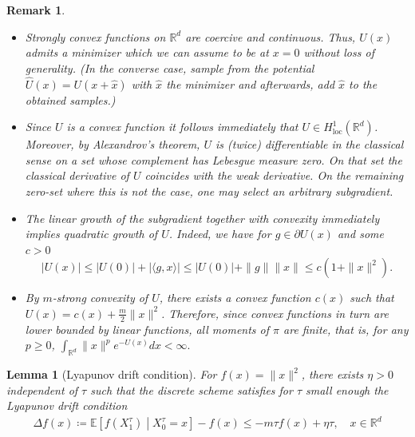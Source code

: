 \documentclass[10pt,a4paper]{amsart}
\newtheorem{remark}{Remark}
\newtheorem{lemma}{Lemma}
\newcommand{\R}{\mathbb{R}}
\begin{document}
\begin{remark}\
\label{rem:Ass_A}
\begin{itemize}
    \item Strongly convex functions on $\R^d$ are coercive and continuous. Thus, $U(x)$ admits a minimizer which we can assume to be at $x=0$ without loss of generality. (In the converse case, sample from the potential $\hat{U}(x) = U(x+\hat{x})$ with $\hat{x}$ the minimizer and afterwards, add $\hat{x}$ to the obtained samples.) 
    \item Since $U$ is a convex function it follows immediately that $U \in H^1_{\text{loc}}( \R^d)$. Moreover, by Alexandrov's theorem, $U$ is (twice) differentiable in the classical sense on a set whose complement has Lebesgue measure zero. On that set the classical derivative of $U$ coincides with the weak derivative. On the remaining zero-set where this is not the case, one may select an arbitrary subgradient.
    \item The linear growth of the subgradient together with convexity immediately implies quadratic growth of $U$. Indeed, we have for $g\in\partial U(x)$ and some $c>0$
    \begin{equation}
        | U(x) | \leq |U(0)| + |\langle g,x\rangle |\leq |U(0)| + \|g\|\|x\|\leq c(1+\|x\|^2).
    \end{equation}
    \item By $m$-strong convexity of $U$, there exists a convex function $c(x)$ such that $U(x) = c(x) + \frac{m}{2}\|x\|^2$. Therefore, since convex functions in turn are lower bounded by linear functions, all moments of $\pi$ are finite, that is, for any $p\geq 0$, $\int_{\R^d} \|x\|^p e^{-U(x)} dx  < \infty.$
\end{itemize}
\end{remark}

\begin{lemma}[Lyapunov drift condition]\label{lemma:lyapunov}
    For $f(x)=\|x\|^2$, there exists $\eta>0$ independent of $\tau$ such that the discrete scheme satisfies for $\tau$ small enough the Lyapunov drift condition 
    \begin{equation*}         
        \begin{aligned}
            \Delta f(x) \coloneqq \mathbb{E} \left[ f(X_1^\tau) \middle| X_0^\tau = x \right] - f(x)
            \leq -m\tau f(x) + \eta\tau,\quad x\in\R^d
        \end{aligned}   
    \end{equation*}
\end{lemma}
\end{document}
